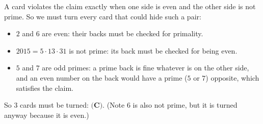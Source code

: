 A card violates the claim exactly when one side is even and the other side is not prime. So we must turn every card that could hide such a pair:
\begin{itemize}
\item $2$ and $6$ are even: their backs must be checked for primality.
\item $2015=5\cdot13\cdot31$ is not prime: its back must be checked for being even.
\item $5$ and $7$ are odd primes: a prime back is fine whatever is on the other side, and an even number on the back would have a prime ($5$ or $7$) opposite, which satisfies the claim.
\end{itemize}
So $3$ cards must be turned: $\boxed{\textbf{(C)}}$. (Note $6$ is also not prime, but it is turned anyway because it is even.)
